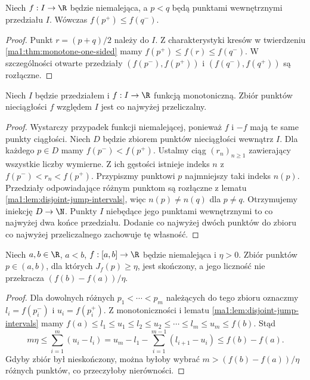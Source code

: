 \begin{lemat}
\label{ma1:lem:disjoint-jump-intervals}
Niech $f:I\to\R$ będzie niemalejąca, a $p<q$ będą punktami wewnętrznymi przedziału $I$. Wówczas $f(p^+)\le f(q^-)$.
\end{lemat}
\begin{proof}
Punkt $r=(p+q)/2$ należy do $I$. Z charakterystyki kresów w twierdzeniu \ref{ma1:thm:monotone-one-sided} mamy $f(p^+)\le f(r)\le f(q^-)$. W szczególności otwarte przedziały $(f(p^-),f(p^+))$ i $(f(q^-),f(q^+))$ są rozłączne.
\end{proof}

\begin{twierdzenie}
\label{ma1:thm:monotone-countable-discontinuities}
Niech $I$ będzie przedziałem i $f:I\to\R$ funkcją monotoniczną. Zbiór punktów nieciągłości $f$ względem $I$ jest co najwyżej przeliczalny.
\end{twierdzenie}
\begin{proof}
Wystarczy przypadek funkcji niemalejącej, ponieważ $f$ i $-f$ mają te same punkty ciągłości. Niech $D$ będzie zbiorem punktów nieciągłości wewnątrz $I$. Dla każdego $p\in D$ mamy $f(p^-)<f(p^+)$. Ustalmy ciąg $(r_n)_{n\ge1}$ zawierający wszystkie liczby wymierne. Z ich gęstości istnieje indeks $n$ z $f(p^-)<r_n<f(p^+)$. Przypiszmy punktowi $p$ najmniejszy taki indeks $n(p)$. Przedziały odpowiadające różnym punktom są rozłączne z lematu \ref{ma1:lem:disjoint-jump-intervals}, więc $n(p)\ne n(q)$ dla $p\ne q$. Otrzymujemy iniekcję $D\to\N$. Punkty $I$ niebędące jego punktami wewnętrznymi to co najwyżej dwa końce przedziału. Dodanie co najwyżej dwóch punktów do zbioru co najwyżej przeliczalnego zachowuje tę własność.
\end{proof}

\begin{twierdzenie}
\label{ma1:thm:finite-large-jumps}
Niech $a,b\in\R$, $a<b$, $f:[a,b]\to\R$ będzie niemalejąca i $\eta>0$. Zbiór punktów $p\in(a,b)$, dla których $J_f(p)\ge\eta$, jest skończony, a jego liczność nie przekracza $(f(b)-f(a))/\eta$.
\end{twierdzenie}
\begin{proof}
Dla dowolnych różnych $p_1<\cdots<p_m$ należących do tego zbioru oznaczmy $l_i=f(p_i^-)$ i $u_i=f(p_i^+)$. Z monotoniczności i lematu \ref{ma1:lem:disjoint-jump-intervals} mamy
$f(a)\le l_1\le u_1\le l_2\le u_2\le\cdots\le l_m\le u_m\le f(b)$.
Stąd
\[
 m\eta\le\sum_{i=1}^m(u_i-l_i)
 =u_m-l_1-\sum_{i=1}^{m-1}(l_{i+1}-u_i)
 \le f(b)-f(a).
\]
Gdyby zbiór był nieskończony, można byłoby wybrać $m>(f(b)-f(a))/\eta$ różnych punktów, co przeczyłoby nierówności.
\end{proof}

